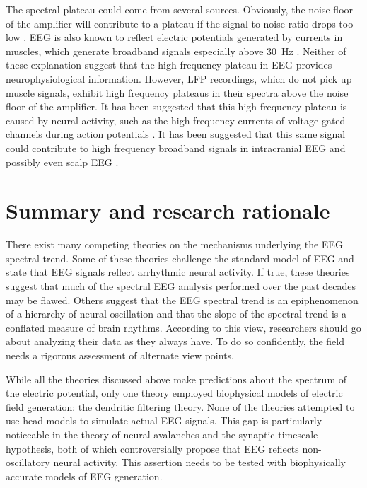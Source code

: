 The spectral plateau could come from several sources. Obviously, the noise floor of the amplifier will contribute to a plateau if the signal to noise ratio drops too low \cite{Scheer2006}. EEG is also known to reflect electric potentials generated by currents in muscles, which generate broadband signals especially above \qty{30}{\hertz} \cite{Muthukumaraswamy2013}. Neither of these explanation suggest that the high frequency plateau in EEG provides neurophysiological information. However, LFP recordings, which do not pick up muscle signals, exhibit high frequency plateaus in their spectra above the noise floor of the amplifier. It has been suggested that this high frequency plateau is caused by neural activity, such as the high frequency currents of voltage-gated channels during action potentials \cite{Ray2008, Ray2011, Gao2016, Zanos2010}. It has been suggested that this same signal could contribute to high frequency broadband signals in intracranial EEG and possibly even scalp EEG \cite{Ray2008}.

\section{Summary and research rationale}

There exist many competing theories on the mechanisms underlying the EEG spectral trend. Some of these theories challenge the standard model of EEG and state that EEG signals reflect arrhythmic neural activity. If true, these theories suggest that much of the spectral EEG analysis performed over the past decades may be flawed. Others suggest that the EEG spectral trend is an epiphenomenon of a hierarchy of neural oscillation and that the slope of the spectral trend is a conflated measure of brain rhythms. According to this view, researchers should go about analyzing their data as they always have. To do so confidently, the field needs a rigorous assessment of alternate view points.

While all the theories discussed above make predictions about the spectrum of the electric potential, only one theory employed biophysical models of electric field generation: the dendritic filtering theory. None of the theories attempted to use head models to simulate actual EEG signals. This gap is particularly noticeable in the theory of neural avalanches and the synaptic timescale hypothesis, both of which controversially propose that EEG reflects non-oscillatory neural activity. This assertion needs to be tested with biophysically accurate models of EEG generation.

